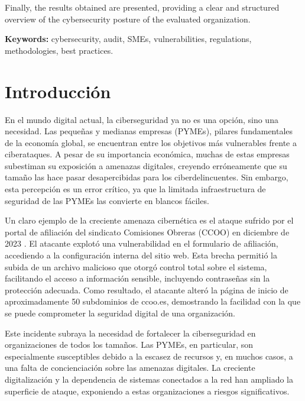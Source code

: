 \documentclass[a4paper, 10pt]{article}
\begin{document}
\par\vspace{0.5cm}

Finally, the results obtained are presented, providing a clear and structured overview of the cybersecurity posture of the evaluated organization.
\par\vspace{0.5cm}
\textbf{Keywords:} cybersecurity, audit, SMEs, vulnerabilities, regulations, methodologies, best practices.
\clearpage


\section{Introducción}
En el mundo digital actual, la ciberseguridad ya no es una opción, sino una necesidad. Las pequeñas y medianas empresas (PYMEs), pilares fundamentales de la economía global, se encuentran entre los objetivos más vulnerables frente a ciberataques. A pesar de su importancia económica, 
muchas de estas empresas subestiman su exposición a amenazas digitales, creyendo erróneamente que su tamaño las hace pasar desapercibidas para los ciberdelincuentes. Sin embargo, esta percepción es un error crítico, ya que la limitada infraestructura de seguridad de las 
PYMEs las convierte en blancos fáciles. 
\par\vspace{0.5cm}

Un claro ejemplo de la creciente amenaza cibernética es el ataque sufrido por el portal de afiliación del sindicato Comisiones Obreras (CCOO) en diciembre de 2023 \cite{farlopa}. El atacante explotó una vulnerabilidad en el formulario de afiliación, accediendo a la configuración interna del sitio web. Esta brecha permitió la subida de un archivo malicioso que otorgó control total sobre el sistema, facilitando el acceso a información sensible, incluyendo contraseñas sin la protección adecuada. Como resultado, el atacante alteró la página de inicio de aproximadamente 50 subdominios de ccoo.es, demostrando la facilidad con la que se puede comprometer la seguridad digital de una organización.
\par\vspace{0.5cm}

Este incidente subraya la necesidad de fortalecer la ciberseguridad en organizaciones de todos los tamaños. Las PYMEs, en particular, son especialmente susceptibles debido a la escasez de recursos y, en muchos casos, a una falta de concienciación sobre las amenazas digitales. 
La creciente digitalización y la dependencia de sistemas conectados a la red han ampliado la superficie de ataque, exponiendo a estas organizaciones a riesgos significativos.
\par\vspace{0.5cm}
\end{document}
